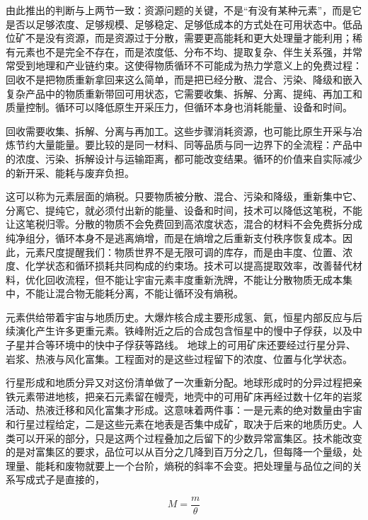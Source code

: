 由此推出的判断与上两节一致：资源问题的关键，不是“有没有某种元素”，而是它是否以足够浓度、足够规模、足够稳定、足够低成本的方式处在可用状态中。低品位矿不是没有资源，而是资源过于分散，需要更高能耗和更大处理量才能利用；稀有元素也不是完全不存在，而是浓度低、分布不均、提取复杂、伴生关系强，并常常受到地理和产业链约束。这使得物质循环不可能成为热力学意义上的免费过程：回收不是把物质重新拿回来这么简单，而是把已经分散、混合、污染、降级和嵌入复杂产品中的物质重新带回可用状态，它需要收集、拆解、分离、提纯、再加工和质量控制。循环可以降低原生开采压力，但循环本身也消耗能量、设备和时间。

回收需要收集、拆解、分离与再加工。这些步骤消耗资源，也可能比原生开采与冶炼节约大量能量。要比较的是同一材料、同等品质与同一边界下的全流程：产品中的浓度、污染、拆解设计与运输距离，都可能改变结果。循环的价值来自实际减少的新开采、能耗与废弃负担。

这可以称为元素层面的熵税。只要物质被分散、混合、污染和降级，重新集中它、分离它、提纯它，就必须付出新的能量、设备和时间，技术可以降低这笔税，不能让这笔税归零。分散的物质不会免费回到高浓度状态，混合的材料不会免费拆分成纯净组分，循环本身不是逃离熵增，而是在熵增之后重新支付秩序恢复成本。因此，元素尺度提醒我们：物质世界不是无限可调的库存，而是由丰度、位置、浓度、化学状态和循环损耗共同构成的约束场。技术可以提高提取效率，改善替代材料，优化回收流程，但不能让宇宙元素丰度重新洗牌，不能让分散物质无成本集中，不能让混合物无能耗分离，不能让循环没有熵税。


元素供给带着宇宙与地质历史。大爆炸核合成主要形成氢、氦，恒星内部反应与后续演化产生许多更重元素。铁峰附近之后的合成包含恒星中的慢中子俘获，以及中子星并合等环境中的快中子俘获等路线。\cite{steigman2007primordial,kobayashi2020origin} 地球上的可用矿床还要经过行星分异、岩浆、热液与风化富集。工程面对的是这些过程留下的浓度、位置与化学状态。

行星形成和地质分异又对这份清单做了一次重新分配。地球形成时的分异过程把亲铁元素带进地核，把亲石元素留在幔壳，地壳中的可用矿床再经过数十亿年的岩浆活动、热液迁移和风化富集才形成。这意味着两件事：一是元素的绝对数量由宇宙和行星过程给定，二是这些元素在地表是否集中成矿，取决于后来的地质历史。人类可以开采的部分，只是这两个过程叠加之后留下的少数异常富集区。技术能改变的是对富集区的要求，品位可以从百分之几降到百万分之几，但每降一个量级，处理量、能耗和废物就要上一个台阶，熵税的斜率不会变。把处理量与品位之间的关系写成式子是直接的，

\begin{equation}
M=\frac{m}{\theta}
\end{equation}

